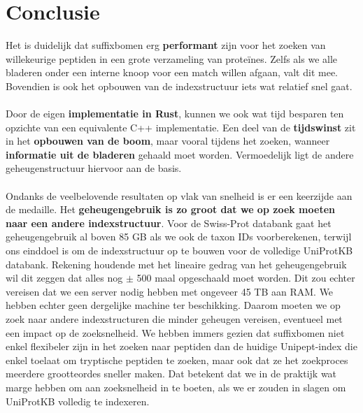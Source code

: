 \section{Conclusie}\label{sec:conclusie-suffix-bomen}
Het is duidelijk dat suffixbomen erg \textbf{performant} zijn voor het zoeken van willekeurige peptiden in een grote verzameling van proteïnes.
Zelfs als we alle bladeren onder een interne knoop voor een match willen afgaan, valt dit mee.
Bovendien is ook het opbouwen van de indexstructuur iets wat relatief snel gaat.
\\ \\
Door de eigen \textbf{implementatie in Rust}, kunnen we ook wat tijd besparen ten opzichte van een equivalente C++ implementatie.
Een deel van de \textbf{tijdswinst} zit in het\textbf{ opbouwen van de boom}, maar vooral tijdens het zoeken, wanneer \textbf{informatie uit de bladeren} gehaald moet worden.
Vermoedelijk ligt de andere geheugenstructuur hiervoor aan de basis.
\\ \\
Ondanks de veelbelovende resultaten op vlak van snelheid is er een keerzijde aan de medaille.
Het \textbf{geheugengebruik is zo groot dat we op zoek moeten naar een andere indexstructuur}.
Voor de Swiss-Prot databank gaat het geheugengebruik al boven 85 GB als we ook de taxon IDs voorberekenen, terwijl ons einddoel is om de indexstructuur op te bouwen voor de volledige UniProtKB databank.
Rekening houdende met het lineaire gedrag van het geheugengebruik wil dit zeggen dat alles nog $\pm$ 500 maal opgeschaald moet worden.
Dit zou echter vereisen dat we een server nodig hebben met ongeveer 45 TB aan RAM\@.
We hebben echter geen dergelijke machine ter beschikking.
Daarom moeten we op zoek naar andere indexstructuren die minder geheugen vereisen, eventueel met een impact op de zoeksnelheid.
We hebben immers gezien dat suffixbomen niet enkel flexibeler zijn in het zoeken naar peptiden dan de huidige Unipept-index die enkel toelaat om tryptische peptiden te zoeken, maar ook dat ze het zoekproces meerdere grootteordes sneller maken.
Dat betekent dat we in de praktijk wat marge hebben om aan zoeksnelheid in te boeten, als we er zouden in slagen om UniProtKB volledig te indexeren.
